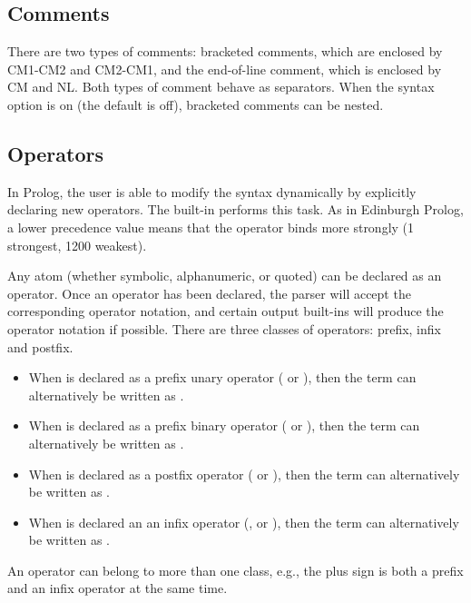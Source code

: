\subsection{Comments}

There are two types of comments: bracketed comments, which are enclosed
by CM1-CM2 and CM2-CM1, and the end-of-line comment, which is enclosed
by CM and NL. Both types of comment behave as separators.
When the syntax option  is on (the default is off),
bracketed comments can be nested.


\subsection{Operators}
In Prolog, the user is able to modify the syntax dynamically by explicitly
declaring new operators. The built-in
 performs this
task. As in Edinburgh Prolog, a lower precedence value means that the
operator binds more strongly (1 strongest, 1200 weakest).

Any atom (whether symbolic, alphanumeric, or quoted) can be declared as an
operator.  Once an operator has been declared, the parser will accept
the corresponding operator notation, and certain output built-ins will
produce the operator notation if possible.  There are three classes of
operators: prefix, infix and postfix.
\begin{itemize}
\item When  is declared as a
  prefix unary operator ( or
  ), then the term  can alternatively be written as
  .
\item When  is declared as a prefix binary operator (
  or ), then the term  can alternatively be
  written as .
\item When  is declared as a postfix operator ( or
  ), then the term  can alternatively be written as
  .
\item When  is declared an an infix operator (,
   or ), then the term  can
  alternatively be written as .
\end{itemize}
An operator can belong to more than one class, e.g., the plus sign
is both a prefix and an infix operator at the same time.

